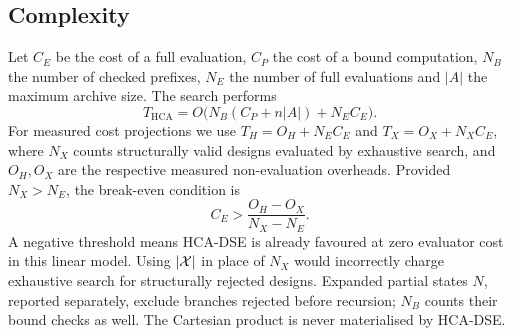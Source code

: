 \subsection{Complexity}
Let $C_E$ be the cost of a full evaluation, $C_P$ the cost of a bound computation,
$N_B$ the number of checked prefixes, $N_E$ the number of full evaluations and $|A|$
the maximum archive size. The search performs
\begin{equation}
T_{\mathrm{HCA}}=O\big(N_B(C_P+n|A|)+N_E C_E\big).
\label{eq:complexity}
\end{equation}
For measured cost projections we use $T_H=O_H+N_E C_E$ and
$T_X=O_X+N_X C_E$, where $N_X$ counts structurally valid designs evaluated by
exhaustive search, and $O_H,O_X$ are the respective measured non-evaluation overheads.
Provided $N_X>N_E$, the break-even condition is
\begin{equation}
C_E > \frac{O_H-O_X}{N_X-N_E}.
\label{eq:breakeven}
\end{equation}
A negative threshold means HCA-DSE is already favoured at zero evaluator cost in this
linear model. Using $|\mathcal{X}|$ in place of $N_X$ would incorrectly charge exhaustive search
for structurally rejected designs. Expanded partial states $N$, reported separately,
exclude branches rejected before recursion; $N_B$ counts their bound checks as well.
The Cartesian product is never materialised by HCA-DSE.
